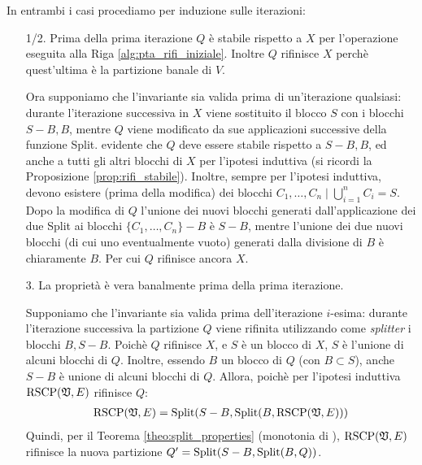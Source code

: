\begin{proof2}
    In entrambi i casi procediamo per induzione sulle iterazioni:
    \begin{itemize}
        \item[1/2.] Prima della prima iterazione $Q$ è stabile rispetto a $X$ per l'operazione eseguita alla Riga \ref{alg:pta_rifi_iniziale}. Inoltre $Q$ rifinisce $X$ perchè quest'ultima è la partizione banale di $V$.

        Ora supponiamo che l'invariante sia valida prima di un'iterazione qualsiasi: durante l'iterazione successiva in $X$ viene sostituito il blocco $S$ con i blocchi $S-B, B$, mentre $Q$ viene modificato da sue applicazioni successive della funzione Split. \accente evidente che $Q$ deve essere stabile rispetto a $S-B, B$, ed anche a tutti gli altri blocchi di $X$ per l'ipotesi induttiva (si ricordi la Proposizione \ref{prop:rifi_stabile}). Inoltre, sempre per l'ipotesi induttiva, devono esistere (prima della modifica) dei blocchi $C_1, \dots, C_n \mid \bigcup_{i=1}^n C_i = S$. Dopo la modifica di $Q$ l'unione dei nuovi blocchi generati dall'applicazione dei due Split ai blocchi $\{C_1, \dots, C_n\} - B$ è $S-B$, mentre l'unione dei due nuovi blocchi (di cui uno eventualmente vuoto) generati dalla divisione di $B$ è chiaramente $B$. Per cui $Q$ rifinisce ancora $X$.
        \item[3.] La proprietà è vera banalmente prima della prima iterazione.

        Supponiamo che l'invariante sia valida prima dell'iterazione $i$-esima: durante l'iterazione successiva la
        partizione $Q$ viene rifinita utilizzando come \emph{splitter} i blocchi $B, S-B$. Poichè $Q$ rifinisce $X$, e $S$ è un blocco di $X$, $S$ è l'unione di alcuni blocchi di $Q$. Inoltre, essendo $B$ un blocco di $Q$ (con $B \subset S$), anche $S-B$ è unione di alcuni blocchi di $Q$. Allora, poichè per l'ipotesi induttiva $\textup{RSCP}(\mathfrak{V},E)$ rifinisce $Q$:
        \begin{gather*}
            \textup{RSCP}(\mathfrak{V},E) = \textup{Split}(S-B, \textup{Split}(B, \textup{RSCP}(\mathfrak{V},E)))
        \end{gather*}
        Quindi, per il Teorema \ref{theo:split_properties} (monotonia di \splitfunc), $\textup{RSCP}(\mathfrak{V},E)$ rifinisce la nuova partizione $Q' = \textup{Split}(S-B, \textup{Split}(B, Q))$.
    \end{itemize}
    \vspace*{-0.75cm}
\end{proof2}

